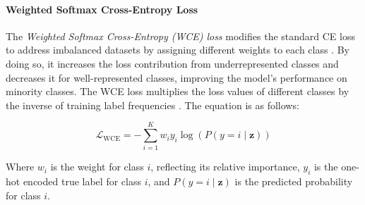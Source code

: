 

\paragraph{Weighted Softmax Cross-Entropy Loss}
The \emph{Weighted Softmax Cross-Entropy (WCE) loss} modifies the standard CE loss to address imbalanced datasets by assigning different weights to each class \cite{pytorch_crossentropy,lin2018focallossdenseobject}. By doing so, it increases the loss contribution from underrepresented classes and decreases it for well-represented classes, improving the model's performance on minority classes. The WCE loss multiplies the loss values of different classes by the inverse of training label frequencies \cite{zhang2023deep}. The equation is as follows:

\begin{equation}
    \mathcal{L}_{\text{WCE}} = -\sum_{i=1}^{K} w_i y_i \log(P(y = i \mid \mathbf{z}))
\end{equation}

Where \( w_i \) is the weight for class \( i \), reflecting its relative importance, \( y_i \) is the one-hot encoded true label for class \( i \), and \( P(y = i \mid \mathbf{z}) \) is the predicted probability for class \( i \).

